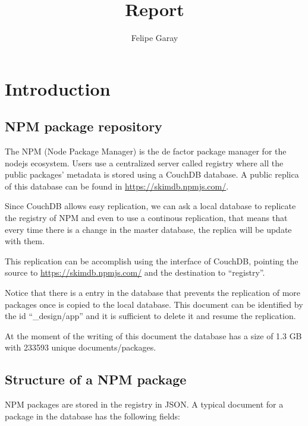 \documentclass[letterpaper,12pt]{report}
\title{Report}
\author{Felipe Garay}
\begin{document}
\maketitle
\newpage
\tableofcontents
\newpage


\chapter{Introduction}




\section{NPM package repository}

The NPM (Node Package Manager) is the de factor package manager for the nodejs
ecosystem. Users use a centralized server called registry where all the public
packages' metadata is stored using a CouchDB database. A public replica of this
database can be found in \url{https://skimdb.npmjs.com/}.

Since CouchDB allows easy replication, we can ask a local database to replicate
the registry of NPM and even to use a continous replication, that means that
every time there is a change in the master database, the replica will be update
with them.

This replication can be accomplish using the interface of CouchDB, pointing the
source to \url{https://skimdb.npmjs.com/} and the destination to ``registry''.

Notice that there is a entry in the database that prevents the replication of
more packages once is copied to the local database. This document can be
identified by the id ``\_design/app'' and it is sufficient to delete it and
resume the replication.

At the moment of the writing of this document the database has a size of 1.3 GB
with 233593	unique documents/packages.

\section{Structure of a NPM package}


NPM packages are stored in the registry in JSON. A typical document for a
package in the database has the following fields:
\end{document}
